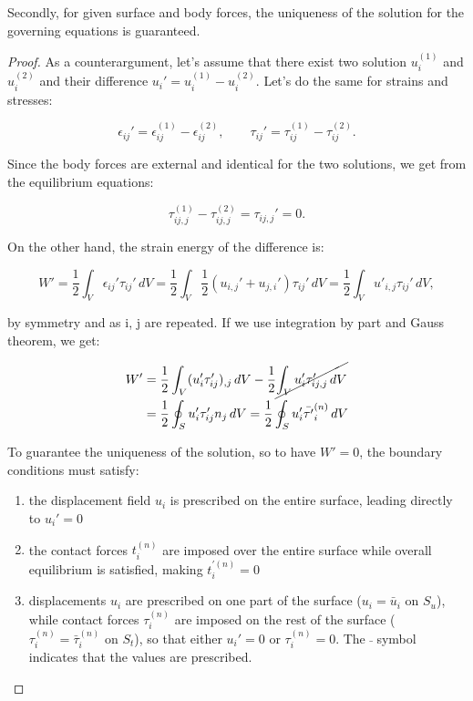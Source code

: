 	Secondly, for given surface and body forces, the uniqueness of the solution for the governing equations is guaranteed. 
	
	\begin{proof}
	As a counterargument, let's assume that there exist two solution $u_i^{(1)}$ and $u_i^{(2)}$ and their difference $u_i ' = u_i^{(1)}-u_i^{(2)}$. Let's do the same for strains and stresses:
	
	\begin{equation}
	\epsilon _{ij} ' = \epsilon_{ij}^{(1)}-\epsilon _{ij}^{(2)}, \qquad \tau _{ij} ' = \tau _{ij}^{(1)}-\tau _{ij}^{(2)}.
	\end{equation}
	
	Since the body forces are external and identical for the two solutions, we get from the equilibrium equations:
	
	\begin{equation}
	\tau_{ij,j}^{(1)}-\tau_{ij,j}^{(2)} = \tau_{ij,j} ' = 0. 
	\end{equation}
	
	On the other hand, the strain energy of the difference is:
	
	\begin{equation}
	W' = \frac{1}{2}\int _V \epsilon _{ij} ' \tau _{ij} ' \, dV =  \frac{1}{2}\int _V \frac{1}{2} (u _{i,j} '+ u _{j,i} ') \tau _{ij} ' \, dV = \frac{1}{2}\int _V u' _{i,j} \tau _{ij} ' \, dV,
	\end{equation}
	
	by symmetry and as i, j are repeated. If we use integration by part and Gauss theorem, we get:
	
	\begin{equation}
	\begin{aligned}
	W' &= \frac{1}{2} \int _V (u' _{i} \tau ' _{ij})_{,j} \, dV - \frac{1}{2} \cancel{\int _V u' _{i} \tau ' _{ij,j} \, dV} \\
	&= \frac{1}{2} \oint _S u' _{i} \tau ' _{ij} n_j \, dV = \frac{1}{2} \oint _S u' _{i} \bar{\tau '} _{i}^{(n)} \, dV
	\end{aligned}
	\end{equation}
	
	To guarantee the uniqueness of the solution, so to have $W' = 0$, the boundary conditions must satisfy:
	
	\begin{enumerate}
	\item the displacement field $u_i$ is prescribed on the entire surface, leading directly to $u_i ' = 0$
	
	\item the contact forces $t_i ^{(n)}$ are imposed over the entire surface while overall equilibrium is satisfied, making $t_i ^{'(n)} = 0$
	
	\item displacements $u_i$ are prescribed on one part of the surface ($u_i = \bar{u}_i$ on $S_u$), while contact forces $\tau _i^{(n)}$ are imposed on the rest of the surface ($\tau _i^{(n)} = \bar{\tau} _i^{(n)}$ on $S_t$), so that either $u_i '= 0$ or $\tau _i^{(n)}= 0$. The $\bar{ }$ symbol indicates that the values are prescribed. 
	\end{enumerate}
	\end{proof}
	
